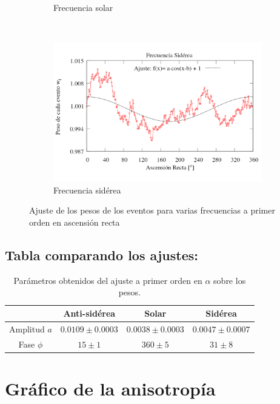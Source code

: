 \begin{figure}[H]
\begin{subfigure}{.5\textwidth}
			\caption{Frecuencia solar}
			\label{fig:ajuste_solar}
		\end{subfigure}\\
		\centering
		\begin{subfigure}{.5\textwidth}
			\centering
			\includegraphics[width=\linewidth]{eventos_RA_ajuste_cos_siderea_v2.png}
			\caption{Frecuencia sidérea}
			\label{fig:ajuste_siderea}
		\end{subfigure}%
		\caption{Ajuste de los pesos de los eventos para varias frecuencias a primer orden en ascensión recta}
		\end{figure}
		
	
\subsection{Tabla comparando los ajustes:}
		
		\begin{table}[H]
		\centering
		\begin{tabular}{c|c|c|c}
					& Anti-sidérea			& Solar 				& Sidérea\\ \hline
		Amplitud $a$& $0.0109\pm 0.0003 $ 	&	$0.0038 \pm 0.0003$	&  $0.0047\pm 0.0007$		\\
		Fase $\phi$ & $15    \pm 1$ 		&   $360 \pm 5   $ 		&  $31    \pm 8    $ 		\\
		\end{tabular}
		\caption{Parámetros obtenidos del ajuste a primer orden en $\alpha$ sobre los pesos.}
		\end{table}


\section{Gráfico de la anisotropía}

